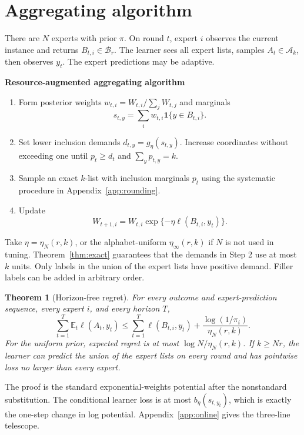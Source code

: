 \documentclass{article}
\newtheorem{theorem}{Theorem}
\theoremstyle{definition}
\theoremstyle{remark}
\newcommand{\E}{\mathbb E}
\newcommand{\cA}{\mathcal A}
\newcommand{\cB}{\mathcal B}
\newcommand{\1}{\mathbf 1}
\begin{document}
\section{Aggregating algorithm}
\label{sec:algorithm}

There are \(N\) experts with prior \(\pi\). On round \(t\), expert \(i\) observes the current instance and returns \(B_{t,i}\in\cB_r\). The learner sees all expert lists, samples \(A_t\in\cA_k\), then observes \(y_t\). The expert predictions may be adaptive.

\begin{minipage}{0.94\linewidth}
\textbf{Resource-augmented aggregating algorithm}
\begin{enumerate}
\item Form posterior weights \(w_{t,i}=W_{t,i}/\sum_jW_{t,j}\) and marginals
\[ s_{t,y}=\sum_iw_{t,i}\1\{y\in B_{t,i}\}. \]
\item Set lower inclusion demands \(d_{t,y}=g_\eta(s_{t,y})\). Increase coordinates without exceeding one until \(p_t\ge d_t\) and \(\sum_yp_{t,y}=k\).
\item Sample an exact \(k\)-list with inclusion marginals \(p_t\) using the systematic procedure in Appendix~\ref{app:rounding}.
\item Update
\[ W_{t+1,i}=W_{t,i} \exp\{-\eta\ell(B_{t,i},y_t)\}. \]
\end{enumerate}
\end{minipage}

Take \(\eta=\eta_N(r,k)\), or the alphabet-uniform \(\eta_\infty(r,k)\) if \(N\) is not used in tuning. Theorem~\ref{thm:exact} guarantees that the demands in Step 2 use at most \(k\) units. Only labels in the union of the expert lists have positive demand. Filler labels can be added in arbitrary order.

\begin{theorem}[Horizon-free regret]
\label{thm:regret}
For every outcome and expert-prediction sequence, every expert \(i\), and every horizon \(T\),
\begin{equation}
\label{eq:regret}
\sum_{t=1}^T\E_t\ell(A_t,y_t)
\le
\sum_{t=1}^T\ell(B_{t,i},y_t)
+\frac{\log(1/\pi_i)}{\eta_N(r,k)}.
\end{equation}
For the uniform prior, expected regret is at most \(\log N/\eta_N(r,k)\). If \(k\ge Nr\), the learner can predict the union of the expert lists on every round and has pointwise loss no larger than every expert.
\end{theorem}

The proof is the standard exponential-weights potential after the nonstandard substitution. The conditional learner loss is at most \(b_\eta(s_{t,y_t})\), which is exactly the one-step change in log potential. Appendix~\ref{app:online} gives the three-line telescope.
\end{document}
